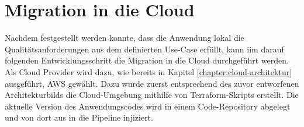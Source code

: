

\section{Migration in die Cloud}
Nachdem festgestellt werden konnte, dass die Anwendung lokal die Qualitätsanforderungen aus dem definierten Use-Case erfüllt, kann iim darauf folgenden Entwicklungsschritt die Migration in die Cloud durchgeführt werden. Als Cloud Provider wird dazu, wie bereits in Kapitel \ref{chapter:cloud-architektur} ausgeführt, \ac{AWS} gewählt. Dazu wurde zuerst entsprechend des zuvor entworfenen Architekturbilds die Cloud-Umgebung mithilfe von \gls{Terraform}-Skripts erstellt. Die aktuelle Version des Anwendungscodes wird in einem Code-Repository abgelegt und von dort aus in die Pipeline injiziert. \pagebreak